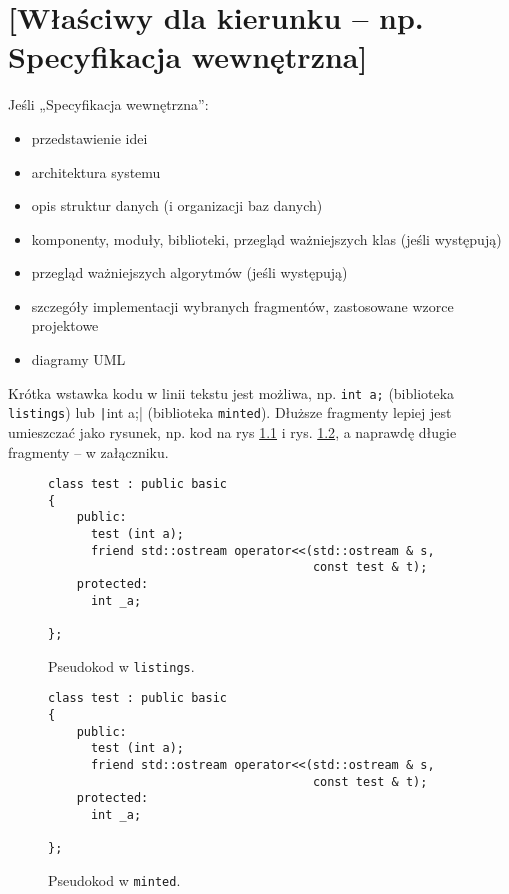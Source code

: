 \chapter{[Właściwy dla kierunku -- np. Specyfikacja wewnętrzna]}
\label{ch:05}


Jeśli „Specyfikacja wewnętrzna”:
\begin{itemize}
\item przedstawienie idei
\item architektura systemu
\item opis struktur danych (i organizacji baz danych)
\item komponenty, moduły, biblioteki, przegląd ważniejszych klas (jeśli występują)
\item przegląd ważniejszych algorytmów (jeśli występują)
\item szczegóły implementacji wybranych fragmentów, zastosowane wzorce projektowe
\item diagramy UML
\end{itemize}



Krótka wstawka kodu w linii tekstu jest możliwa, np.  \lstinline|int a;| (biblioteka \texttt{listings}) lub  \texttt|int a;| (biblioteka \texttt{minted}). 
Dłuższe fragmenty lepiej jest umieszczać jako rysunek, np. kod na rys \ref{fig:pseudokod:listings} i rys. \ref{fig:pseudokod:minted}, a naprawdę długie fragmenty – w załączniku.
 



\begin{figure}
\centering
\begin{lstlisting}
class test : public basic
{
    public:
      test (int a);
      friend std::ostream operator<<(std::ostream & s, 
                                     const test & t);
    protected:
      int _a;  
      
};
\end{lstlisting}
\caption{Pseudokod w \texttt{listings}.}
\label{fig:pseudokod:listings}
\end{figure}

\begin{figure}
\centering
\begin{verbatim}
class test : public basic
{
    public:
      test (int a);
      friend std::ostream operator<<(std::ostream & s, 
                                     const test & t);
    protected:
      int _a;  
      
};
\end{verbatim}
\caption{Pseudokod w \texttt{minted}.}
\label{fig:pseudokod:minted}
\end{figure}


